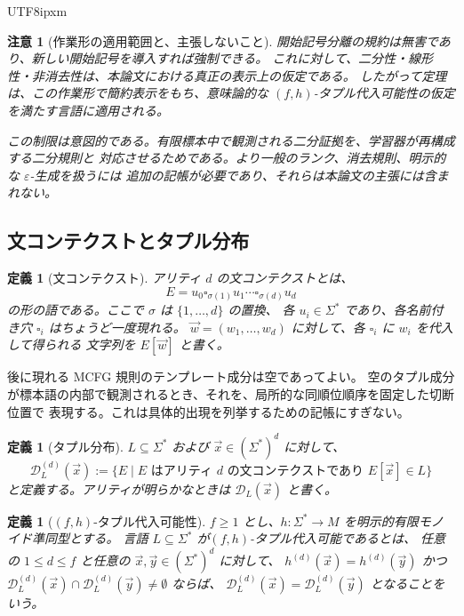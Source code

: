 \documentclass[10pt,a4paper]{article}
\newtheorem{definition}[theorem]{定義}
\newtheorem{remark}[theorem]{注意}
\theoremstyle{remark}
\newcommand{\D}{\mathcal{D}}
\newcommand{\tuple}[1]{\vec{#1}}
\newcommand{\blank}{\square}
\newcommand{\eps}{\varepsilon}
\begin{document}
\begin{CJK}{UTF8}{ipxm}
\begin{remark}[作業形の適用範囲と、主張しないこと]
開始記号分離の規約は無害であり、新しい開始記号を導入すれば強制できる。
これに対して、二分性・線形性・非消去性は、本論文における真正の表示上の仮定である。
したがって定理は、この作業形で簡約表示をもち、意味論的な
\((f,h)\)-タプル代入可能性の仮定を満たす言語に適用される。

この制限は意図的である。有限標本中で観測される二分証拠を、学習器が再構成する二分規則と
対応させるためである。より一般のランク、消去規則、明示的な \(\eps\)-生成を扱うには
追加の記帳が必要であり、それらは本論文の主張には含まれない。
\end{remark}

\subsection{文コンテクストとタプル分布}

\begin{definition}[文コンテクスト]
\label{def:sentence-context}
\emph{アリティ \(d\) の文コンテクスト}とは、
\[
  E=u_0\blank_{\sigma(1)}u_1\cdots\blank_{\sigma(d)}u_d
\]
の形の語である。ここで \(\sigma\) は \(\{1,\ldots,d\}\) の置換、
各 \(u_i\in\Sigma^*\) であり、各名前付き穴 \(\blank_i\) はちょうど一度現れる。
\(\tuple w=(w_1,\ldots,w_d)\) に対して、各 \(\blank_i\) に \(w_i\) を代入して得られる
文字列を \(E[\tuple w]\) と書く。
\end{definition}

後に現れる MCFG 規則のテンプレート成分は空であってよい。
空のタプル成分が標本語の内部で観測されるとき、それを、局所的な同順位順序を固定した切断位置で
表現する。これは具体的出現を列挙するための記帳にすぎない。

\begin{definition}[タプル分布]
\label{def:tuple-distribution}
\(L\subseteq\Sigma^*\) および \(\tuple x\in(\Sigma^*)^d\) に対して、
\[
\D_L^{(d)}(\tuple x):=
\{E\mid E\text{ はアリティ }d\text{ の文コンテクストであり }E[\tuple x]\in L\}
\]
と定義する。アリティが明らかなときは \(\D_L(\tuple x)\) と書く。
\end{definition}

\begin{definition}[\((f,h)\)-タプル代入可能性]
\label{def:tuple-substitutable}
\(f\ge1\) とし、\(h\colon\Sigma^*\to M\) を明示的有限モノイド準同型とする。
言語 \(L\subseteq\Sigma^*\) が\emph{\((f,h)\)-タプル代入可能}であるとは、
任意の \(1\le d\le f\) と任意の
\(\tuple x,\tuple y\in(\Sigma^*)^d\) に対して、
\(h^{(d)}(\tuple x)=h^{(d)}(\tuple y)\) かつ
\(\D_L^{(d)}(\tuple x)\cap\D_L^{(d)}(\tuple y)\ne\emptyset\) ならば、
\(\D_L^{(d)}(\tuple x)=\D_L^{(d)}(\tuple y)\) となることをいう。
\end{definition}


\end{CJK}
\end{document}
